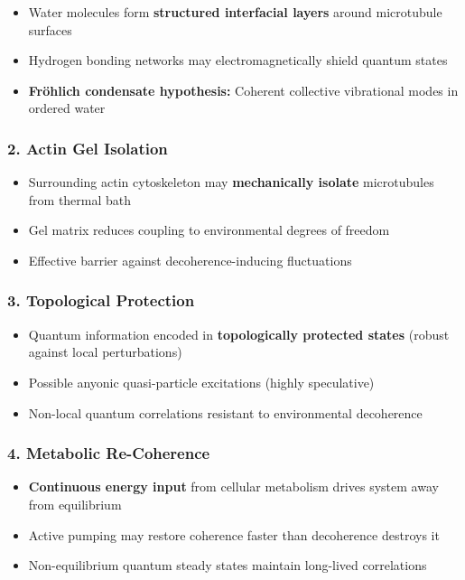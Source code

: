 \begin{itemize}
\item Water molecules form \textbf{structured interfacial layers} around microtubule surfaces
\item Hydrogen bonding networks may electromagnetically shield quantum states
\item \textbf{Fr\"ohlich condensate hypothesis:} Coherent collective vibrational modes in ordered water
\end{itemize}

\subsubsection{2. Actin Gel Isolation}

\begin{itemize}
\item Surrounding actin cytoskeleton may \textbf{mechanically isolate} microtubules from thermal bath
\item Gel matrix reduces coupling to environmental degrees of freedom
\item Effective barrier against decoherence-inducing fluctuations
\end{itemize}

\subsubsection{3. Topological Protection}

\begin{itemize}
\item Quantum information encoded in \textbf{topologically protected states} (robust against local perturbations)
\item Possible anyonic quasi-particle excitations (highly speculative)
\item Non-local quantum correlations resistant to environmental decoherence
\end{itemize}

\subsubsection{4. Metabolic Re-Coherence}

\begin{itemize}
\item \textbf{Continuous energy input} from cellular metabolism drives system away from equilibrium
\item Active pumping may restore coherence faster than decoherence destroys it
\item Non-equilibrium quantum steady states maintain long-lived correlations
\end{itemize}

